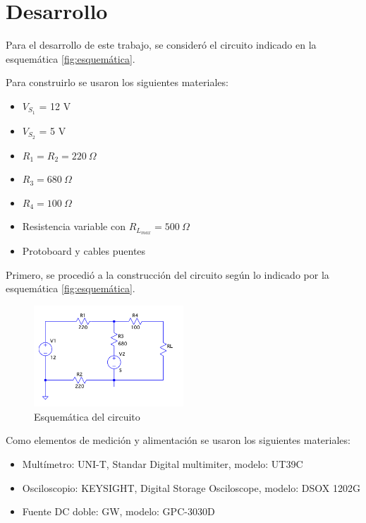 \documentclass{article}
\begin{document}
    \indent
    \section{Desarrollo}
        \quad Para el desarrollo de este trabajo, se consideró el circuito indicado en la esquemática \autoref{fig:esquemática}.\par
        Para construirlo se usaron los siguientes materiales:\par
        
            	\begin{itemize}
                \item $V_{S_{1}}$ = 12 V
                \item $V_{S_{2}}$ = 5 V
                \item $R_{1} = R_{2} = 220 ~\Omega $
                \item $R_{3} = 680~ \Omega $
                \item $R_{4} = 100~ \Omega $
                \item Resistencia variable con $R_{L_{max}} = 500~\Omega$
                \item Protoboard y cables puentes
                \end{itemize}
        
        
        Primero, se procedió a la construcción del circuito según lo indicado por la esquemática \autoref{fig:esquemática}.\par %

\begin{figure}[!h]
  \centering
  \includegraphics[width=0.5\textwidth]{lab1.png}
  \caption{Esquemática del circuito}
  \label{fig:esquemática}
\end{figure}
        
       Como elementos de medición y alimentación se usaron los siguientes materiales:\par
       
                   \begin{itemize}
                \item Multímetro: UNI-T,  Standar Digital multimiter, modelo: UT39C
                \item Osciloscopio: KEYSIGHT, Digital Storage Osciloscope, modelo: DSOX 1202G 
                \item Fuente DC doble: GW, modelo: GPC-3030D
                \end{itemize}
\end{document}
